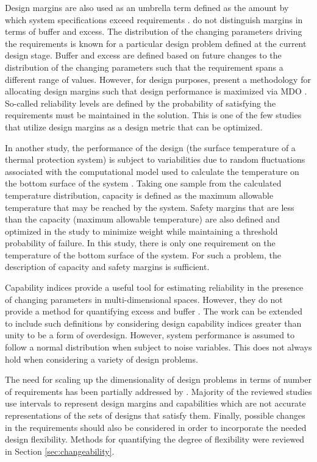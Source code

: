 Design margins are also used as an umbrella term defined as the amount by which system specifications exceed requirements \cite{Cross2015}. \citeauthor{Cross2015} do not distinguish margins in terms of buffer and excess. The distribution of the changing parameters driving the requirements is known for a particular design problem defined at the current design stage. Buffer and excess are defined based on future changes to the distribution of the changing parameters such that the requirement spans a different range of values. However, for design purposes, \citeauthor{Cross2015} present a methodology for allocating design margins such that design performance is maximized via \ac{MDO} \cite{Cross2015}. So-called reliability levels are defined by the probability of satisfying the requirements must be maintained in the solution. This is one of the few studies that utilize design margins as a design metric that can be optimized. 

In another study, the performance of the design (the surface temperature of a thermal protection system) is subject to variabilities due to random fluctuations associated with the computational model used to calculate the temperature on the bottom surface of the system \cite{Villanueva2014}. Taking one sample from the calculated temperature distribution, capacity is defined as the maximum allowable temperature that may be reached by the system. Safety margins that are less than the capacity (maximum allowable temperature) are also defined and optimized in the study to minimize weight while maintaining a threshold probability of failure. In this study, there is only one requirement on the temperature of the bottom surface of the system. For such a problem, the description of capacity and safety margins is sufficient. 

{\color{red} Capability indices provide a useful tool for estimating reliability in the presence of changing parameters in multi-dimensional spaces. However, they do not provide a method for quantifying excess and buffer \cite{Chen1999}. The work can be extended to include such definitions by considering design capability indices greater than unity to be a form of overdesign. However, system performance is assumed to follow a normal distribution when subject to noise variables. This does not always hold when considering a variety of design problems.}

The need for scaling up the dimensionality of design problems in terms of number of requirements has been {\color{red} partially addressed by \citeauthor{Chen1999} \cite{Chen1999}. Majority of the reviewed studies use intervals to represent design margins and capabilities  which are not accurate representations of the sets of designs that satisfy them.} Finally, possible changes in the requirements should also be considered in order to incorporate the needed design flexibility. Methods for quantifying the degree of flexibility were reviewed in Section \ref{sec:changeability}.

